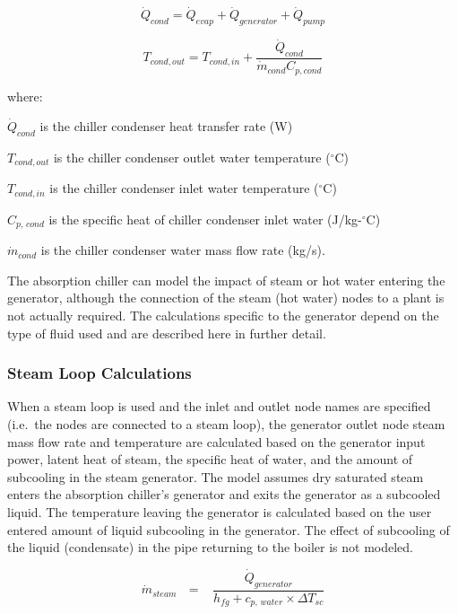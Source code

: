 \begin{equation}
{\dot Q_{cond}} = {\dot Q_{evap}} + {\dot Q_{generator}} + {\dot Q_{pump}}
\end{equation}

\begin{equation}
  T_{cond,out} = T_{cond,in} + \frac{\dot{Q}_{cond}}{\dot{m}_{cond}C_{p,cond}}
\end{equation}

where:

\({\dot Q_{cond}}\) is the chiller condenser heat transfer rate (W)

\({T_{cond,out}}\) is the chiller condenser outlet water temperature (\(^{\circ}\)C)

\({T_{cond,in}}\) is the chiller condenser inlet water temperature (\(^{\circ}\)C)

\({C_{p,\,cond}}\) is the specific heat of chiller condenser inlet water (J/kg-\(^{\circ}\)C)

\({\dot m_{cond}}\) is the chiller condenser water mass flow rate (kg/s).

The absorption chiller can model the impact of steam or hot water entering the generator, although the connection of the steam (hot water) nodes to a plant is not actually required. The calculations specific to the generator depend on the type of fluid used and are described here in further detail.

\subsubsection{Steam Loop Calculations}\label{steam-loop-calculations}

When a steam loop is used and the inlet and outlet node names are specified (i.e.~the nodes are connected to a steam loop), the generator outlet node steam mass flow rate and temperature are calculated based on the generator input power, latent heat of steam, the specific heat of water, and the amount of subcooling in the steam generator. The model assumes dry saturated steam enters the absorption chiller's generator and exits the generator as a subcooled liquid. The temperature leaving the generator is calculated based on the user entered amount of liquid subcooling in the generator. The effect of subcooling of the liquid (condensate) in the pipe returning to the boiler is not modeled.

\begin{equation}
{\dot m_{steam}}\,\,\,\, = \,\,\,\,\,\frac{{{{\dot Q}_{generator}}}}{{{h_{fg}} + {c_{p,\,water}} \times \Delta {T_{sc}}}}
\end{equation}


